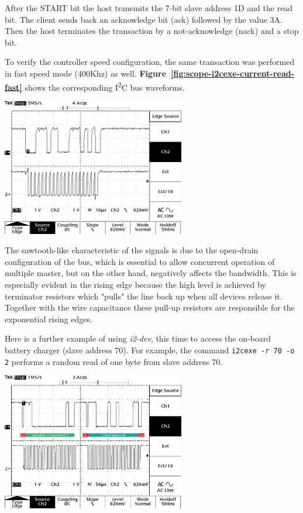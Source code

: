 \documentclass[a4paper,10pt]{article}
\makeatletter
\newenvironment{figurehere}{\def\@captype{figure}\vspace{2ex}}{\vspace{2ex}}
\newcommand{\iic}{I\textsuperscript{2}C }
\newcommand{\keyword}[1]{\texttt{#1}}
\newcommand{\reff}[1]{\textbf{Figure~\ref{#1}}}
\makeatother
\begin{document}
\begin{multicols}{2}
After the START bit the host transmits the 7-bit slave address 1D and the read
bit. The client sends back an acknowledge bit (ack) followed by the value 3A.
Then the host terminates the transaction by a not-acknowledge (nack) and a stop
bit.

To verify the controller speed configuration, the same transaction was performed
in fast speed mode (400Khz) as well. \reff{fig:scope-i2cexe-current-read-fast}
shows the corresponding \iic bus waveforms.

\begin{figurehere}
 \centering
 \includegraphics[width=8cm]{./figures/scope-i2cexe-current-read-fast.png}
 \caption{SCL and SDA waveforms of a current address read operation performed at
	fast speed.}
 \label{fig:scope-i2cexe-current-read-fast}
\end{figurehere}

The sawtooth-like characteristic of the signals is due to the open-drain
configuration of the bus, which is essential to allow concurrent operation of
multiple master, but on the other hand, negatively affects the bandwidth.
This is especially evident in the rising edge because the high level is
achieved by terminator resistors which "pulls" the line back up when all
devices release it.
Together with the wire capacitance these pull-up resistors are responsible for
the exponential rising edges.

Here is a further example of using \emph{i2-dev}, this time to access
the on-board battery charger (slave address 70). For example, the command
\keyword{i2cexe -r 70 -o 2} performs a random read of one byte from slave
address 70.

\begin{figurehere}
 \centering
 \includegraphics[width=8cm]{./figures/scope-i2cexe-random-read-std.png}
 \caption{SCL and SDA waveforms of a random read operation from slave address 70
	at offset 2.}
 \label{fig:scope-i2cexe-random-read-std}
\end{figurehere}


\end{multicols}
\end{document}
